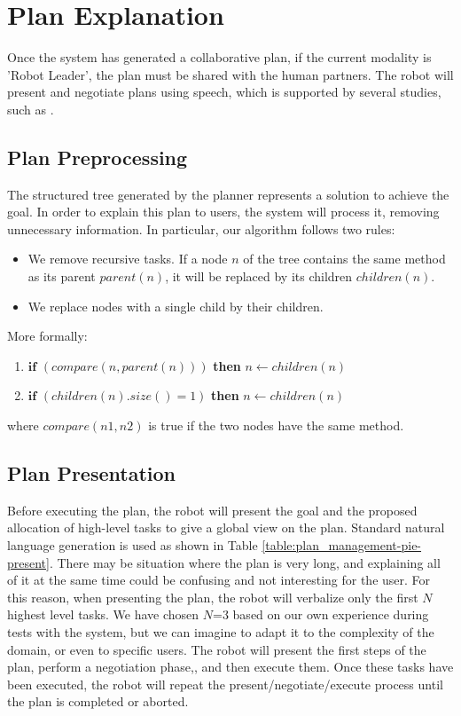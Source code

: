 \section{Plan Explanation}
\label{sec:plan_management-plan_explanation}
Once the system has generated a collaborative plan, if the current modality is 'Robot Leader', the plan must be shared with the human partners. The robot will present and negotiate plans using speech, which is supported by several studies, such as \cite{Lallee2013,tomasello2005}.

\subsection{Plan Preprocessing}
The structured tree generated by the planner represents a solution to achieve the goal. In order to explain this plan to users, the system will process it, removing unnecessary information. In particular, our algorithm follows two rules:
\begin{itemize}
	\item  We remove recursive tasks. If a node $n$ of the tree contains the same method as its parent $parent(n)$, it will be replaced by its children $children(n)$. 
	\item We replace nodes with a single child by their children.
\end{itemize}

More formally:
\begin{enumerate}
\item $\textbf{if}$ $(compare(n, parent(n)))$ \textbf{then} $n \leftarrow children(n)$
\item $\textbf{if}$ $(children(n).size() = 1)$ \textbf{then} $n \leftarrow children(n)$
\end{enumerate}

where $compare(n1,n2)$ is true if the two nodes have the same method.

\subsection{Plan Presentation}
Before executing the plan, the robot will present the goal and the proposed allocation of high-level tasks to give a global view on the plan. Standard natural language generation is used as shown in Table \ref{table:plan_management-pie-present}. 
There may be situation where the plan is very long, and explaining all of it at the same time could be confusing and not interesting for the user. For this reason, when presenting the plan, the robot will verbalize only the first $N$  highest level tasks. We have chosen $N$=$3$ based on our own experience during tests with the system, but we can imagine to adapt it to the complexity of the domain, or even to specific users. The robot will present the first steps of the plan, perform a negotiation phase,, and then execute them. Once these tasks have been executed, the robot will repeat the present/negotiate/execute process until the plan is completed or aborted.
 
